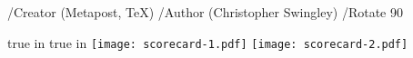 %
%
%
%
%
%
\pdfinfo
  { /Creator        (Metapost, TeX)
    /Author         (Christopher Swingley) }
\pdfpagesattr
  { /Rotate 90 }



\resetatcatcode
{} true in
 true in
\topmargin 0.75cm
\bottommargin 0.75cm
\leftmargin 1.20cm
\rightmargin 0.55cm
\nopagenumbers
\parindent=0pt\parskip=8pt
\vfill
\texttt{[image: scorecard-1.pdf]}
\vfill\eject
\texttt{[image: scorecard-2.pdf]}
\vfill\eject
\bye

